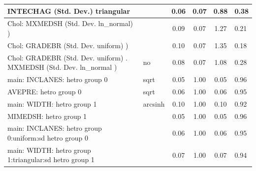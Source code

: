 \begin{table}
\begin{center}
\begin{tabular}{|l|l|c|c|c|l|}
			\hline
			INTECHAG (Std. Dev.) triangular &  & 0.06 & 0.07 & 0.88 & 0.38 \\
			\hline
			 Chol: MXMEDSH (Std. Dev. ln_normal) ) &  & 0.09 & 0.07 & 1.27 & 0.21 \\
			\hline
			 Chol: GRADEBR (Std. Dev. uniform) ) &  & 0.10 & 0.07 & 1.35 & 0.18 \\
			\hline
			 Chol: GRADEBR (Std. Dev. uniform) . MXMEDSH (Std. Dev.   ln_normal ) & no & 0.08 & 0.07 & 1.08 & 0.28 \\
			\hline
			main: INCLANES: hetro group 0 & sqrt & 0.05 & 1.00 & 0.05 & 0.96 \\
			\hline
			AVEPRE: hetro group 0 & sqrt & 0.06 & 1.00 & 0.06 & 0.95 \\
			\hline
			main: WIDTH: hetro group 1 & arcsinh & 0.10 & 1.00 & 0.10 & 0.92 \\
			\hline
			MIMEDSH: hetro group 1 &  & 0.05 & 1.00 & 0.05 & 0.96 \\
			\hline
			main: INCLANES: hetro group 0:uniform:sd  hetro group 0 &  & 0.06 & 1.00 & 0.06 & 0.95 \\
			\hline
			main: WIDTH: hetro group 1:triangular:sd  hetro group 1 &  & 0.07 & 1.00 & 0.07 & 0.94 \\
			\hline
		\end{tabular}
	\end{center}
\end{table}